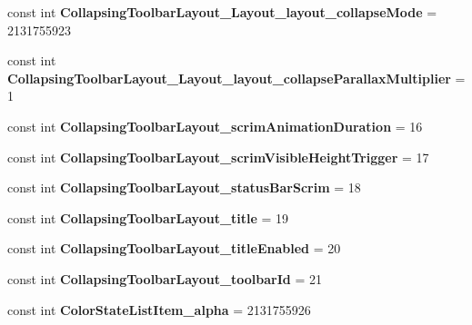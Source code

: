 \begin{DoxyCompactItemize}
const int {\bfseries Collapsing\+Toolbar\+Layout\+\_\+\+Layout\+\_\+layout\+\_\+collapse\+Mode} = 2131755923
\item 
\mbox{\label{classst_delivery_1_1_resource_1_1_styleable_a52d5cff3d22c36abe3cf6f54ebc4ef8d}} 
const int {\bfseries Collapsing\+Toolbar\+Layout\+\_\+\+Layout\+\_\+layout\+\_\+collapse\+Parallax\+Multiplier} = 1
\item 
\mbox{\label{classst_delivery_1_1_resource_1_1_styleable_a6e646a6b462aa623dac2e2d2f97ea7d3}} 
const int {\bfseries Collapsing\+Toolbar\+Layout\+\_\+scrim\+Animation\+Duration} = 16
\item 
\mbox{\label{classst_delivery_1_1_resource_1_1_styleable_a0c20989ec6d21f5eb8b130499e2b6840}} 
const int {\bfseries Collapsing\+Toolbar\+Layout\+\_\+scrim\+Visible\+Height\+Trigger} = 17
\item 
\mbox{\label{classst_delivery_1_1_resource_1_1_styleable_a341bbf4632fda04098f1cff5e74942d5}} 
const int {\bfseries Collapsing\+Toolbar\+Layout\+\_\+status\+Bar\+Scrim} = 18
\item 
\mbox{\label{classst_delivery_1_1_resource_1_1_styleable_ad1c2002898be5b01c30b31be9670f5e7}} 
const int {\bfseries Collapsing\+Toolbar\+Layout\+\_\+title} = 19
\item 
\mbox{\label{classst_delivery_1_1_resource_1_1_styleable_a2de1eaa903635b04d7106723c52da187}} 
const int {\bfseries Collapsing\+Toolbar\+Layout\+\_\+title\+Enabled} = 20
\item 
\mbox{\label{classst_delivery_1_1_resource_1_1_styleable_a070332d458c2fdfa42d4028a41f1611d}} 
const int {\bfseries Collapsing\+Toolbar\+Layout\+\_\+toolbar\+Id} = 21
\item 
\mbox{\label{classst_delivery_1_1_resource_1_1_styleable_a0e387944f23eda9681018356af2fa8ae}} 
const int {\bfseries Color\+State\+List\+Item\+\_\+alpha} = 2131755926

\end{DoxyCompactItemize}
